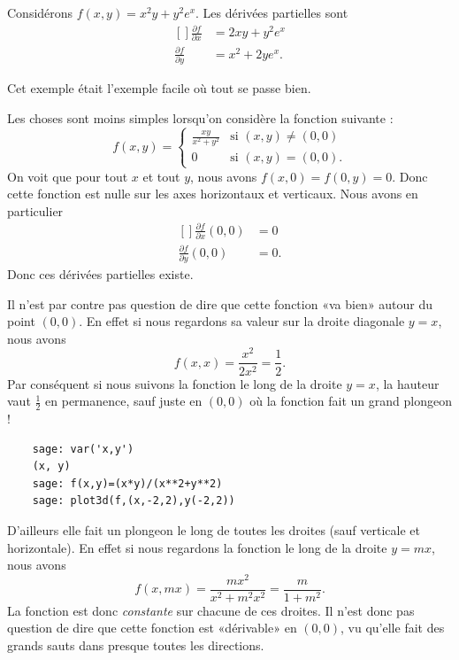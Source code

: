 \begin{example}
    Considérons $f(x,y)=x^2y+y^2 e^{x}$. Les dérivées partielles sont
    \begin{equation}
        \begin{aligned}[]
            \frac{ \partial f }{ \partial x }&=2xy+y^2e^x\\
            \frac{ \partial f }{ \partial y }&=x^2+2ye^x.
        \end{aligned}
    \end{equation}
\end{example}

Cet exemple était l'exemple facile où tout se passe bien.

\begin{example}
    Les choses sont moins simples lorsqu'on considère la fonction suivante :
    \begin{equation}
        f(x,y)=\begin{cases}
            \frac{ xy }{ x^2+y^2 }    &   \text{si }(x,y)\neq(0,0)\\
            0    &    \text{si }(x,y)=(0,0).
        \end{cases}
    \end{equation}
    On voit que pour tout $x$ et tout $y$, nous avons $f(x,0)=f(0,y)=0$. Donc cette fonction est nulle sur les axes horizontaux et verticaux. Nous avons en particulier
    \begin{equation}
        \begin{aligned}[]
            \frac{ \partial f }{ \partial x }(0,0)&=0\\
            \frac{ \partial f }{ \partial y }(0,0)&=0.
        \end{aligned}
    \end{equation}
    Donc ces dérivées partielles existe.

    Il n'est par contre pas question de dire que cette fonction «va bien» autour du point $(0,0)$. En effet si nous regardons sa valeur sur la droite diagonale $y=x$, nous avons
    \begin{equation}
        f(x,x)=\frac{ x^2 }{ 2x^2 }=\frac{ 1 }{2}.
    \end{equation}
    Par conséquent si nous suivons la fonction le long de la droite $y=x$, la hauteur vaut $\frac{ 1 }{2}$ en permanence, sauf juste en $(0,0)$ où la fonction fait un grand plongeon !
    \begin{verbatim}
    sage: var('x,y')
    (x, y)
    sage: f(x,y)=(x*y)/(x**2+y**2)
    sage: plot3d(f,(x,-2,2),y(-2,2))
    \end{verbatim}

    D'ailleurs elle fait un plongeon le long de toutes les droites (sauf verticale et horizontale). En effet si nous regardons la fonction le long de la droite $y=mx$, nous avons
    \begin{equation}
        f(x,mx)=\frac{ mx^2 }{ x^2+m^2x^2 }=\frac{ m }{ 1+m^2 }.
    \end{equation}
    La fonction est donc \emph{constante} sur chacune de ces droites. Il n'est donc pas question de dire que cette fonction est «dérivable» en $(0,0)$, vu qu'elle fait des grands sauts dans presque toutes les directions.
\end{example}

